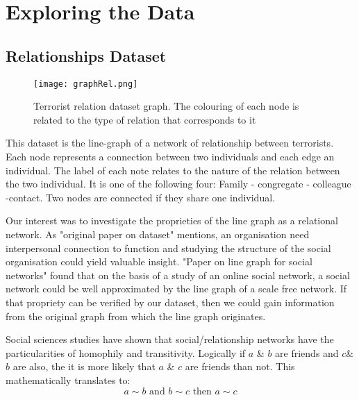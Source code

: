 \section{Exploring the Data}
\label{sec:Exploring the Data}

\subsection{Relationships Dataset}
\label{subsec:Relationships Dataset}

\begin{figure}[H]
\begin{center}

        \texttt{[image: graphRel.png]}
        \label{fig:graphLoc}
        \caption{Terrorist relation dataset graph. The colouring of each node is related to the type of relation that corresponds to it}
        
\end{center}
\end{figure}

This dataset is the line-graph of a network of relationship between terrorists. Each node represents a connection between two individuals and each edge an individual. 
The label of each note relates to the nature of the relation between the two individual. It is one of the following four: 
Family - congregate - colleague -contact.
Two nodes are connected if they share one individual.

Our interest was to investigate the proprieties of the line graph as a relational network. As "original paper on dataset" mentions, an organisation need interpersonal connection to function and studying the structure of the social organisation could yield valuable insight.
"Paper on line graph for social networks" found that on the basis of a study of an online social network, a social network could be well approximated by the line graph of a scale free network. If that propriety can be verified by our dataset, then we could gain information from the original graph from which the line graph originates.

\label{subsec:Proprieties of the graphs}
Social sciences studies have shown that social/relationship networks have the particularities of homophily and transitivity.
Logically if $a$ \& $b$ are friends and $c$\& $b$ are also, the it is more likely that $a$ \& $c$ are friends than not. This mathematically translates to:
\begin{equation}
	a \sim b \text{ and } b \sim c \text{ then } a \sim c
\end{equation}

